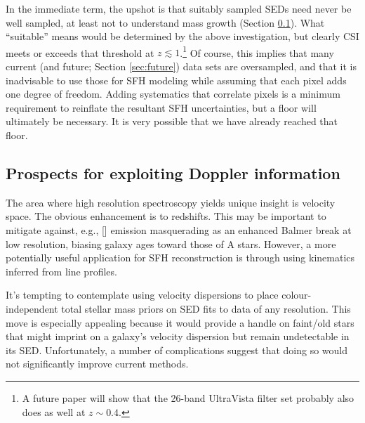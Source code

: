 \documentclass[a4paper,fleqn,usenatbib]{mnras}
\begin{document}
In the immediate term, the upshot is that suitably sampled SEDs need never be well sampled, at least
not to understand mass growth (Section \ref{sec:redshifts}). What ``suitable'' means would be determined 
by the above investigation, but clearly CSI meets or exceeds that threshold at $z\lesssim1$.\footnote{A future 
paper will show that the 26-band UltraVista filter set \citep{Muzzin13} probably also does as well at 
$z\sim0.4$.} Of course, this implies that many current (and future; Section \ref{sec:future}) data sets 
are oversampled, and that it is inadvisable to use those for SFH modeling while assuming that each 
pixel adds one degree of freedom. Adding systematics that correlate pixels is a minimum requirement 
to reinflate the resultant SFH uncertainties, but a floor will ultimately be necessary. It is very possible 
that we have already reached that floor.
\fi


\subsection{Prospects for exploiting Doppler information}
\label{sec:redshifts}

The area where high resolution spectroscopy yields unique insight is velocity space. The 
obvious enhancement is to redshifts. This may be important to mitigate against, e.g., []
emission masquerading as an enhanced Balmer break at low resolution, biasing galaxy ages 
toward those of A stars. However, a more potentially useful application for SFH reconstruction
is through using kinematics inferred from line profiles.

It's tempting to contemplate using velocity dispersions 
to place colour-independent total stellar mass priors on SED fits to data of any resolution. This
move is especially appealing because it would provide a handle on faint/old stars that might imprint on 
a galaxy's velocity dispersion but remain undetectable in its SED. Unfortunately, a number of 
complications suggest that doing so would not significantly improve current methods.
\end{document}
